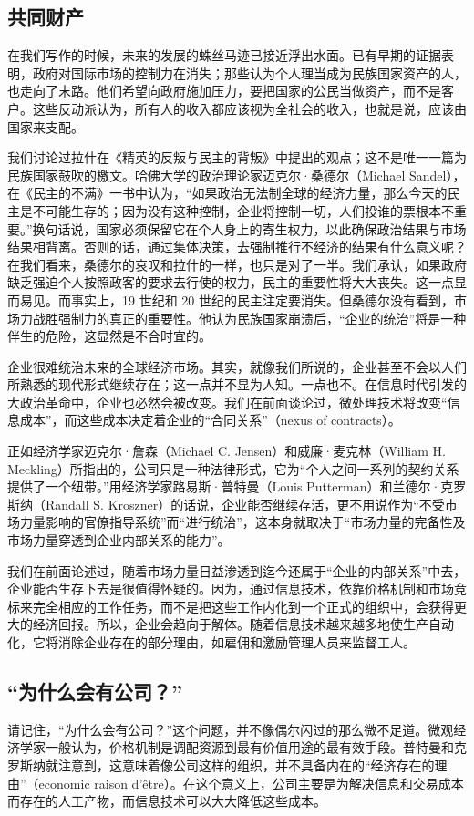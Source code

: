 \subsection{共同财产}
在我们写作的时候，未来的发展的蛛丝马迹已接近浮出水面。已有早期的证据表明，政府对国际市场的控制力在消失；那些认为个人理当成为民族国家资产的人，也走向了末路。他们希望向政府施加压力，要把国家的公民当做资产，而不是客户。这些反动派认为，所有人的收入都应该视为全社会的收入，也就是说，应该由国家来支配。

我们讨论过拉什在《精英的反叛与民主的背叛》中提出的观点；这不是唯一一篇为民族国家鼓吹的檄文。哈佛大学的政治理论家迈克尔·桑德尔（Michael Sandel），在《民主的不满》一书中认为，“如果政治无法制全球的经济力量，那么今天的民主是不可能生存的；因为没有这种控制，企业将控制一切，人们投谁的票根本不重要。”换句话说，国家必须保留它在个人身上的寄生权力，以此确保政治结果与市场结果相背离。否则的话，通过集体决策，去强制推行不经济的结果有什么意义呢？在我们看来，桑德尔的哀叹和拉什的一样，也只是对了一半。我们承认，如果政府缺乏强迫个人按照政客的要求去行使的权力，民主的重要性将大大丧失。这一点显而易见。而事实上，19 世纪和 20 世纪的民主注定要消失。但桑德尔没有看到，市场力战胜强制力的真正的重要性。他认为民族国家崩溃后，“企业的统治”将是一种伴生的危险，这显然是不合时宜的。

企业很难统治未来的全球经济市场。其实，就像我们所说的，企业甚至不会以人们所熟悉的现代形式继续存在；这一点并不显为人知。一点也不。在信息时代引发的大政治革命中，企业也必然会被改变。我们在前面谈论过，微处理技术将改变“信息成本”，而这些成本决定着企业的“合同关系”（nexus of contracts）。

正如经济学家迈克尔·詹森（Michael C. Jensen）和威廉·麦克林（William H. Meckling）所指出的，公司只是一种法律形式，它为“个人之间一系列的契约关系提供了一个纽带。”用经济学家路易斯·普特曼（Louis Putterman）和兰德尔·克罗斯纳（Randall S. Kroszner）的话说，企业能否继续存活，更不用说作为“不受市场力量影响的官僚指导系统”而“进行统治”，这本身就取决于“市场力量的完备性及市场力量穿透到企业内部关系的能力”。

我们在前面论述过，随着市场力量日益渗透到迄今还属于“企业的内部关系”中去，企业能否生存下去是很值得怀疑的。因为，通过信息技术，依靠价格机制和市场竞标来完全相应的工作任务，而不是把这些工作内化到一个正式的组织中，会获得更大的经济回报。所以，企业会趋向于解体。随着信息技术越来越多地使生产自动化，它将消除企业存在的部分理由，如雇佣和激励管理人员来监督工人。

\subsection{“为什么会有公司？”}
请记住，“为什么会有公司？”这个问题，并不像偶尔闪过的那么微不足道。微观经济学家一般认为，价格机制是调配资源到最有价值用途的最有效手段。普特曼和克罗斯纳就注意到，这意味着像公司这样的组织，并不具备内在的“经济存在的理由”（economic raison d’être）。在这个意义上，公司主要是为解决信息和交易成本而存在的人工产物，而信息技术可以大大降低这些成本。

